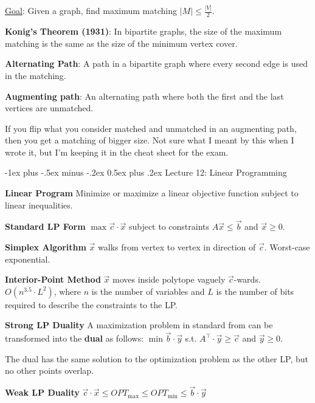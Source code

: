 \documentclass[10pt,landscape]{article}
\makeatletter
\renewcommand{\section}{\@startsection{section}{1}{0mm}%
                                {-1ex plus -.5ex minus -.2ex}%
                                {0.5ex plus .2ex}%
                                {\normalfont\large\bfseries}}
\newcommand{\definition}[1]{\textbf{#1}\hspace{2pt}}
\makeatother
\begin{document}
\begin{multicols}{3}
\underline{Goal}: Given a graph, find maximum matching $|M| \leq \frac{|V|}{2}$.

\definition{Konig's Theorem (1931)}: In bipartite graphs, the size of the maximum matching is the same as the size of the minimum vertex cover.

\definition{Alternating Path}: A path in a bipartite graph where every second edge is used in the matching.

\definition{Augmenting path}: An alternating path where both the first and the last vertices are unmatched.

If you flip what you consider matched and unmatched in an augmenting path, then you get a matching of bigger size. Not sure what I meant by this when I wrote it, but I'm keeping it in the cheat sheet for the exam.


\section{Lecture 12: Linear Programming}

\definition{Linear Program} Minimize or maximize a linear objective function subject to linear inequalities.

\definition{Standard LP Form} $\max \vec{c} \cdot \vec{x}$ subject to constraints $A \vec{x} \leq \vec{b}$ and $\vec{x} \geq 0$.


\definition{Simplex Algorithm} $\vec{x}$ walks from vertex to vertex in direction of $\vec{c}$. Worst-case exponential.

\definition{Interior-Point Method} $\vec{x}$ moves inside polytope vaguely $\vec{c}$-wards. $O(n^{3.5} \cdot L^2)$, where $n$ is the number of variables and $L$ is the number of bits required to describe the constraints to the LP.

\definition{Strong LP Duality} A maximization problem in standard from can be transformed into the \textbf{dual} as follows: $\min \vec{b} \cdot \vec{y}$ s.t. $A^{\top} \cdot \vec{y} \geq \vec{c}$ and $\vec{y} \geq 0$.

The dual has the same solution to the optimization problem as the other LP, but no other points overlap.

\definition{Weak LP Duality} $\vec{c} \cdot \vec{x} \leq OPT_{\max} \leq OPT_{\min} \leq \vec{b} \cdot \vec{y}$



\end{multicols}
\end{document}
